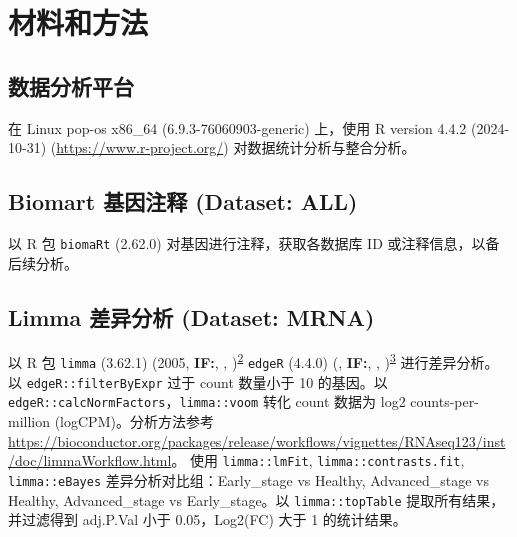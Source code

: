 \documentclass[
]{article}
\begin{document}
\begin{center}\vspace{1.5cm}\end{center}

\hypertarget{introduction}{%
\section{材料和方法}\label{introduction}}

\hypertarget{ux6570ux636eux5206ux6790ux5e73ux53f0}{%
\subsection{数据分析平台}\label{ux6570ux636eux5206ux6790ux5e73ux53f0}}

在 Linux pop-os x86\_64 (6.9.3-76060903-generic) 上，使用 R version 4.4.2 (2024-10-31) (\url{https://www.r-project.org/}) 对数据统计分析与整合分析。

\hypertarget{biomart-ux57faux56e0ux6ce8ux91ca-dataset-all}{%
\subsection{Biomart 基因注释 (Dataset: ALL)}\label{biomart-ux57faux56e0ux6ce8ux91ca-dataset-all}}

以 R 包 \texttt{biomaRt} (2.62.0) 对基因进行注释，获取各数据库 ID 或注释信息，以备后续分析。

\hypertarget{limma-ux5deeux5f02ux5206ux6790-dataset-mrna}{%
\subsection{Limma 差异分析 (Dataset: MRNA)}\label{limma-ux5deeux5f02ux5206ux6790-dataset-mrna}}

以 R 包 \texttt{limma} (3.62.1) (2005, \textbf{IF:}, , )\textsuperscript{\protect\hyperlink{ref-LimmaLinearMSmyth2005}{2}} \texttt{edgeR} (4.4.0) (, \textbf{IF:}, , )\textsuperscript{\protect\hyperlink{ref-EdgerDifferenChen}{3}} 进行差异分析。以 \texttt{edgeR::filterByExpr} 过于 count 数量小于 10 的基因。以 \texttt{edgeR::calcNormFactors}，\texttt{limma::voom} 转化 count 数据为 log2 counts-per-million (logCPM)。分析方法参考 \url{https://bioconductor.org/packages/release/workflows/vignettes/RNAseq123/inst/doc/limmaWorkflow.html}。
使用 \texttt{limma::lmFit}, \texttt{limma::contrasts.fit}, \texttt{limma::eBayes} 差异分析对比组：Early\_stage vs Healthy, Advanced\_stage vs Healthy, Advanced\_stage vs Early\_stage。以 \texttt{limma::topTable} 提取所有结果，并过滤得到 adj.P.Val 小于 0.05，\textbar Log2(FC)\textbar{} 大于 1 的统计结果。
\end{document}

